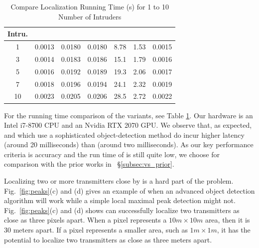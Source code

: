 \begin{table}[ht]
	\centering
	\caption{Compare Localization Running Time (s) for 1 to 10 Number of Intruders}
	\vspace{-0.1in}
	\begin{tabular}{c c c c c c c}
		\hline\hline
		\small{Intru.} & \small{\ourpeak}  & \small{\ouryolo} & \small{\our} & \small{\map} & \small{\splot} & \small{\deeptx} \\
		\hline
		1 & 0.0013 & 0.0180 & 0.0180 & 8.78 & 1.53 & 0.0015 \\ 
		3 & 0.0014 & 0.0183 &  0.0186 & 15.1 & 1.79 & 0.0016 \\
		5 & 0.0016 & 0.0192 &  0.0189 & 19.3 & 2.06 & 0.0017\\
		7 & 0.0018 & 0.0196 &  0.0194 & 24.1 & 2.32 & 0.0019 \\
		10 & 0.0023 & 0.0205 & 0.0206 & 28.5 & 2.72 & 0.0022 \\
		\hline
	\end{tabular}
	\label{table:running-time}	
\end{table}


 For the running time comparison of the variants, see Table \ref{table:running-time}. 
Our hardware is an Intel i7-8700 CPU and an Nvidia RTX 2070 GPU. 
We observe that, as expected, \our and \ouryolo which use a sophisticated object-detection method do incur higher latency (around 20 milliseconds) than \ourpeak (around two milliseconds). As our key
performance criteria is accuracy and the run time of \our is still quite low, we choose \our for comparison with the prior works in ~\S\ref{subsec:vs_prior}. 


Localizing two or more transmitters close by is a hard part of the \mtl problem.
Fig.~\ref{fig:peaks}(c) and (d) gives an example of when an advanced object detection algorithm will work while a simple local maximal peak detection might not.
Fig.~\ref{fig:peaks}(c) and (d) shows \our can successfully localize two transmitters as close as three pixels apart.
When a pixel represents a $10m \times 10m$ area, then it is 30 meters apart.
If a pixel represents a smaller area, such as $1m \times 1m$, it has the potential to localize two transmitters as close as three meters apart.

